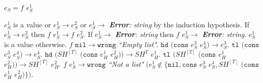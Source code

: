 \begin{case}

$e_{S}=f$ $e_{S}^{1}$

$e_{S}^{1}$ is a value or $e_{S}^{1}\rightarrow e_{S}^{2}$ or $e_{S}^{1}\rightarrow$ \emph{\textbf{Error}: string} by the induction hypothesis.  If $e_{S}^{1}\rightarrow e_{S}^{2}$ then $f$ $e_{S}^{1}\rightarrow f$ $e_{S}^{2}$.  If $e_{S}^{1}\rightarrow$ \emph{\textbf{Error}: string} then $f$ $e_{S}^{1}\rightarrow$ \emph{\textbf{Error}: string}.  $e_{S}^{1}$ is a value otherwise.  $f$ $\mathtt{nil}\rightarrow\mathtt{wrong}$ \emph{``Empty list"}.  $\mathtt{hd}$ $(\mathtt{cons}$ $e_{S}^{3}$ $e_{S}^{4})\rightarrow e_{S}^{3}$.  $\mathtt{tl}$ $(\mathtt{cons}$ $e_{S}^{3}$ $e_{S}^{4})\rightarrow e_{S}^{4}$.  $\mathtt{hd}$ $(SH^{[T]}$ $(\mathtt{cons}$ $e_{H}^{1}$ $e_{H}^{2}))\rightarrow SH^{T}$ $e_{H}^{1}$.  $\mathtt{tl}$ $(SH^{[T]}$ $(\mathtt{cons}$ $e_{H}^{1}$ $e_{H}^{2}))\rightarrow SH^{[T]}$ $e_{H}^{2}$.  $f$ $e_{S}^{1}\rightarrow\mathtt{wrong}$ \emph{``Not a list"} $(e_{S}^{1}\not\in\lbrace\mathtt{nil},\mathtt{cons}$ $e_{S}^{3}$ $e_{S}^{4},SH^{[T]}$ $(\mathtt{cons}$ $e_{H}^{1}$ $e_{H}^{2})\rbrace)$.

\end{case}
